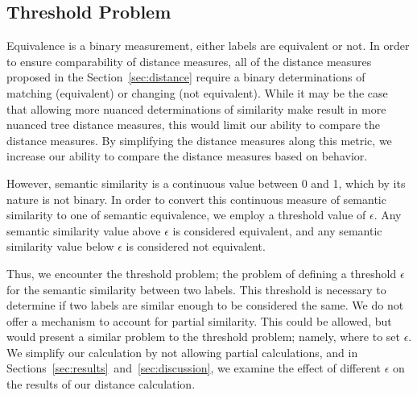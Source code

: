 \subsection{Threshold Problem}
\label{sssec:threshold-problem}

Equivalence is a binary measurement, either labels are equivalent or not. In order to ensure comparability of distance measures, all of the distance measures proposed in the Section~\ref{sec:distance} require a binary determinations of matching (equivalent) or changing (not equivalent). While it may be the case that allowing more nuanced determinations of similarity make result in more nuanced tree distance measures, this would limit our ability to compare the distance measures. By simplifying the distance measures along this metric, we increase our ability to compare the distance measures based on behavior.

However, semantic similarity is a continuous value between 0 and 1, which by its nature is not binary. In order to convert this continuous measure of semantic similarity to one of semantic equivalence, we employ a threshold value of $\epsilon$. Any semantic similarity value above $\epsilon$ is considered equivalent, and any semantic similarity value below $\epsilon$ is considered not equivalent.

Thus, we encounter the threshold problem; the problem of defining a threshold $\epsilon$ for the semantic similarity between two labels. This threshold is necessary to determine if two labels are similar enough to be considered the same. We do not offer a mechanism to account for partial similarity. This could be allowed, but would present a similar problem to the threshold problem; namely, where to set $\epsilon$. We simplify our calculation by not allowing partial calculations, and in Sections~\ref{sec:results}~and~\ref{sec:discussion}, we examine the effect of different $\epsilon$ on the results of our distance calculation.

